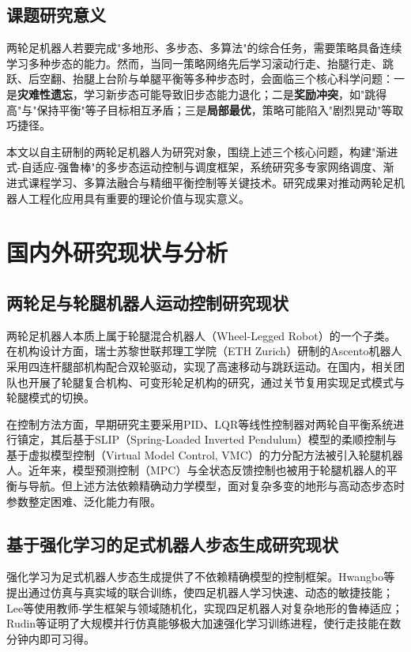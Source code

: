 \subsection{课题研究意义}

两轮足机器人若要完成"多地形、多步态、多算法"的综合任务，需要策略具备连续学习多种步态的能力。然而，当同一策略网络先后学习滚动行走、抬腿行走、跳跃、后空翻、抬腿上台阶与单腿平衡等多种步态时，会面临三个核心科学问题：一是\textbf{灾难性遗忘}，学习新步态可能导致旧步态能力退化；二是\textbf{奖励冲突}，如"跳得高"与"保持平衡"等子目标相互矛盾；三是\textbf{局部最优}，策略可能陷入"剧烈晃动"等取巧捷径。

本文以自主研制的两轮足机器人为研究对象，围绕上述三个核心问题，构建"渐进式-自适应-强鲁棒"的多步态运动控制与调度框架，系统研究多专家网络调度、渐进式课程学习、多算法融合与精细平衡控制等关键技术。研究成果对推动两轮足机器人工程化应用具有重要的理论价值与现实意义。

\section{国内外研究现状与分析}

\subsection{两轮足与轮腿机器人运动控制研究现状}

两轮足机器人本质上属于轮腿混合机器人（Wheel-Legged Robot）的一个子类。在机构设计方面，瑞士苏黎世联邦理工学院（ETH Zurich）研制的Ascento机器人采用四连杆腿部机构配合双轮驱动，实现了高速移动与跳跃运动\cite{klemm2019}。在国内，相关团队也开展了轮腿复合机构、可变形轮足机构的研究，通过关节复用实现足式模式与轮腿模式的切换。

在控制方法方面，早期研究主要采用PID、LQR等线性控制器对两轮自平衡系统进行镇定，其后基于SLIP（Spring-Loaded Inverted Pendulum）模型的柔顺控制与基于虚拟模型控制（Virtual Model Control, VMC）的力分配方法被引入轮腿机器人\cite{pratt2001,blickhan1989}。近年来，模型预测控制（MPC）与全状态反馈控制也被用于轮腿机器人的平衡与导航。但上述方法依赖精确动力学模型，面对复杂多变的地形与高动态步态时参数整定困难、泛化能力有限。

\subsection{基于强化学习的足式机器人步态生成研究现状}

强化学习为足式机器人步态生成提供了不依赖精确模型的控制框架。Hwangbo等\cite{hwangbo2019}提出通过仿真与真实域的联合训练，使四足机器人学习快速、动态的敏捷技能；Lee等\cite{lee2020}使用教师-学生框架与领域随机化，实现四足机器人对复杂地形的鲁棒适应；Rudin等\cite{rudin2022}证明了大规模并行仿真能够极大加速强化学习训练进程，使行走技能在数分钟内即可习得。

